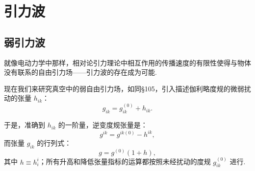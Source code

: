 \chapter{引力波}

\section{弱引力波}

就像电动力学中那样，相对论引力理论中相互作用的传播速度的有限性使得与物体没有联系的自由引力场——引力波的存在成为可能.

现在我们来研究真空中的弱自由引力场，如同§105，引入描述伽利略度规的微弱扰动的张量 $h_{ik}$：
\begin{equation}
  g_{ik}=g_{ik}^{(0)}+h_{ik}.
\end{equation}

于是，准确到 $h_{ik}$ 的一阶量，逆变度规张量是：
\begin{equation}
  g^{ik}=g^{ik(0)}-h^{ik},
\end{equation}
而张量 $g_{ik}$ 的行列式：
\begin{equation}
  g=g^{(0)}(1+h),
\end{equation}
其中 $h\equiv h_i^i$；所有升高和降低张量指标的运算都按照未经扰动的度规 $g_{ik}^{(0)}$ 进行.

